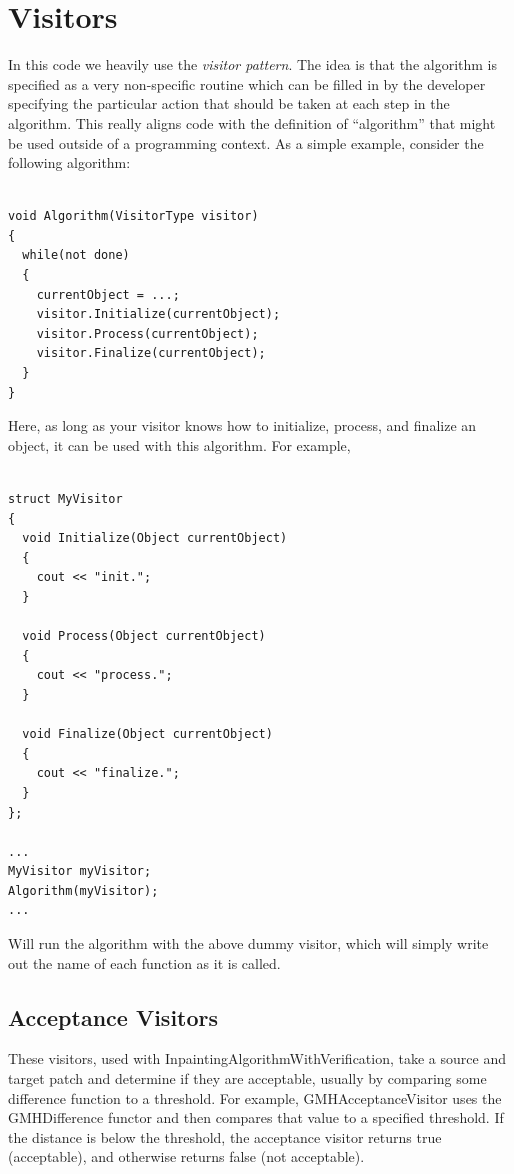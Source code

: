 \documentclass{InsightArticle}
\begin{document}
\section{Visitors}
In this code we heavily use the \emph{visitor pattern}. The idea is that the algorithm is specified as a very non-specific routine which can be filled in by the developer specifying the particular action that should be taken at each step in the algorithm. This really aligns code with the definition of ``algorithm'' that might be used outside of a programming context. As a simple example, consider the following algorithm:

\begin{verbatim}
 
void Algorithm(VisitorType visitor)
{
  while(not done)
  {
    currentObject = ...;
    visitor.Initialize(currentObject);
    visitor.Process(currentObject);
    visitor.Finalize(currentObject);
  }
}
\end{verbatim}

Here, as long as your visitor knows how to initialize, process, and finalize an object, it can be used with this algorithm. For example,

\begin{verbatim}
 
struct MyVisitor
{
  void Initialize(Object currentObject)
  {
    cout << "init.";
  }

  void Process(Object currentObject)
  {
    cout << "process.";
  }

  void Finalize(Object currentObject)
  {
    cout << "finalize.";
  }
};

...
MyVisitor myVisitor;
Algorithm(myVisitor);
...

\end{verbatim}

Will run the algorithm with the above dummy visitor, which will simply write out the name of each function as it is called.

\subsection{Acceptance Visitors}
These visitors, used with InpaintingAlgorithmWithVerification, take a source and target patch and determine if they are acceptable, usually by comparing some difference function to a threshold. For example, GMHAcceptanceVisitor uses the GMHDifference functor and then compares that value to a specified threshold. If the distance is below the threshold, the acceptance visitor returns true (acceptable), and otherwise returns false (not acceptable).
\end{document}
